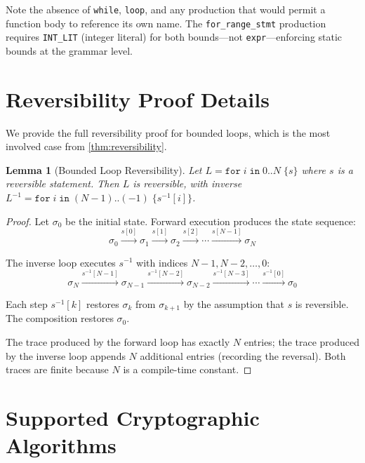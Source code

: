 \documentclass[11pt,a4paper]{article}
\newtheorem{lemma}[theorem]{Lemma}
\newcommand{\inv}[1]{#1^{-1}}
\begin{document}
Note the absence of \texttt{while}, \texttt{loop}, and any production that
would permit a function body to reference its own name.  The \texttt{for\_range\_stmt}
production requires \texttt{INT\_LIT} (integer literal) for both bounds---not
\texttt{expr}---enforcing static bounds at the grammar level.


\section{Reversibility Proof Details}
\label{app:reversibility}

We provide the full reversibility proof for bounded loops, which is the most
involved case from \cref{thm:reversibility}.

\begin{lemma}[Bounded Loop Reversibility]
Let $L = \texttt{for}\;i\;\texttt{in}\;0\texttt{..}N\;\{s\}$ where $s$ is a
reversible statement.  Then $L$ is reversible, with inverse
$\inv{L} = \texttt{for}\;i\;\texttt{in}\;(N{-}1)\texttt{..}(-1)\;\{\inv{s}[i]\}$.
\end{lemma}

\begin{proof}
Let $\sigma_0$ be the initial state.  Forward execution produces the state
sequence:
\[
  \sigma_0 \xrightarrow{s[0]} \sigma_1 \xrightarrow{s[1]} \sigma_2
  \xrightarrow{s[2]} \cdots \xrightarrow{s[N{-}1]} \sigma_N
\]

The inverse loop executes $\inv{s}$ with indices $N{-}1, N{-}2, \ldots, 0$:
\[
  \sigma_N \xrightarrow{\inv{s}[N{-}1]} \sigma_{N-1}
  \xrightarrow{\inv{s}[N{-}2]} \sigma_{N-2}
  \xrightarrow{\inv{s}[N{-}3]} \cdots
  \xrightarrow{\inv{s}[0]} \sigma_0
\]

Each step $\inv{s}[k]$ restores $\sigma_k$ from $\sigma_{k+1}$ by the
assumption that $s$ is reversible.  The composition restores $\sigma_0$.

The trace produced by the forward loop has exactly $N$ entries; the trace
produced by the inverse loop appends $N$ additional entries (recording the
reversal).  Both traces are finite because $N$ is a compile-time constant.
\end{proof}


\section{Supported Cryptographic Algorithms}
\label{app:crypto}
\end{document}
